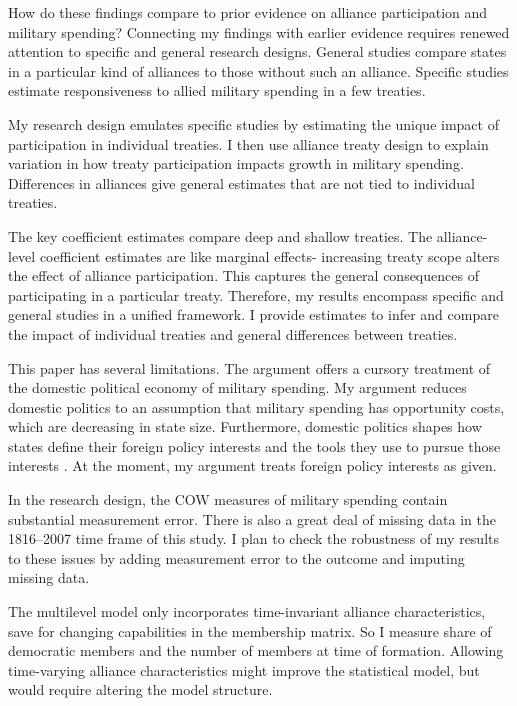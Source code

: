 \documentclass[12pt]{article}
\begin{document}
How do these findings compare to prior evidence on alliance participation and military spending? 
Connecting my findings with earlier evidence requires renewed attention to specific and general research designs. 
General studies compare states in a particular kind of alliances to those without such an alliance. 
Specific studies estimate responsiveness to allied military spending in a few treaties. 


My research design emulates specific studies by estimating the unique impact of participation in individual treaties. 
I then use alliance treaty design to explain variation in how treaty participation impacts growth in military spending.
Differences in alliances give general estimates that are not tied to individual treaties.  


The key coefficient estimates compare deep and shallow treaties. 
The alliance-level coefficient estimates are like marginal effects- increasing treaty scope alters the effect of alliance participation.
This captures the general consequences of participating in a particular treaty. 
Therefore, my results encompass specific and general studies in a unified framework. 
I provide estimates to infer and compare the impact of individual treaties and general differences between treaties. 


This paper has several limitations.
The argument offers a cursory treatment of the domestic political economy of military spending. 
My argument reduces domestic politics to an assumption that military spending has opportunity costs, which are decreasing in state size. 
Furthermore, domestic politics shapes how states define their foreign policy interests and the tools they use to pursue those interests \citep{Fordham1998, Fordham2011, Narizny2007}.
At the moment, my argument treats foreign policy interests as given.  


In the research design, the COW measures of military spending contain substantial measurement error. 
There is also a great deal of missing data in the 1816--2007 time frame of this study. 
I plan to check the robustness of my results to these issues by adding measurement error to the outcome and imputing missing data.


The multilevel model only incorporates time-invariant alliance characteristics, save for changing capabilities in the membership matrix. 
So I measure share of democratic members and the number of members at time of formation. 
Allowing time-varying alliance characteristics might improve the statistical model, but would require altering the model structure. 
\end{document}
